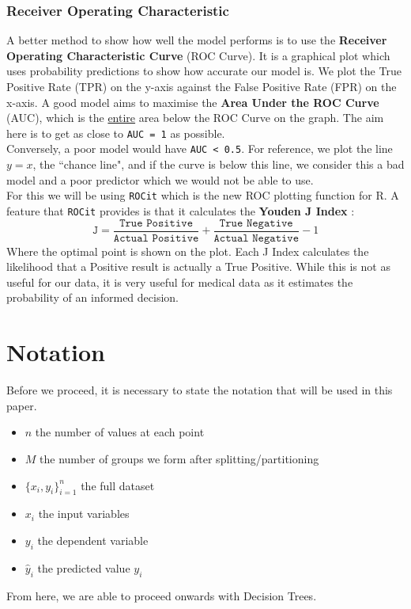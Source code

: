 \documentclass[11pt,a4paper]{report}
\begin{document}
\subsubsection{Receiver Operating Characteristic}
A better method to show how well the model performs is to use the \textbf{Receiver Operating Characteristic Curve} (ROC Curve). 
It is a graphical plot which uses probability predictions to show how accurate our model is.
We plot the True Positive Rate (TPR) on the y-axis against the False Positive Rate (FPR) on the x-axis.
A good model aims to maximise the \textbf{Area Under the ROC Curve} (AUC), which is the \underline{entire} area below the ROC Curve on the graph. 
The aim here is to get as close to \texttt{AUC = 1} as possible.
\bigskip\\
Conversely, a poor model would have \texttt{AUC < 0.5}. 
For reference, we plot the line $y = x$, the ``chance line", and if the curve is below this line, we consider this a bad model and a poor predictor which we would not be able to use.
\bigskip\\
For this we will be using {\color{blue} \texttt{ROCit}} \cite{rocit} which is the new ROC plotting function for R. 
A feature that {\color{blue} \texttt{ROCit}} provides is that it calculates the \textbf{Youden J Index} \cite{youden}:
\[ \texttt{J} = \frac{\texttt{True Positive}}{\texttt{Actual Positive}} + \frac{\texttt{True Negative}}{\texttt{Actual Negative}} - 1 \]
Where the optimal point is shown on the plot.
Each J Index calculates the likelihood that a Positive result is actually a True Positive. 
While this is not as useful for our data, it is very useful for medical data as it estimates the probability of an informed decision.



\section{Notation}
Before we proceed, it is necessary to state the notation that will be used in this paper.
\begin{itemize}
    \item $n$ the number of values at each point
    
    \item $M$ the number of groups we form after splitting/partitioning
    
    \item $\{x_{i},y_{i}\}_{i=1}^{n}$ the full dataset
    
    \item $x_{i}$ the input variables
    
    \item $y_{i}$ the dependent variable
    
    \item $\hat{y}_{i}$ the predicted value $y_{i}$

\end{itemize}
From here, we are able to proceed onwards with Decision Trees.
\end{document}

